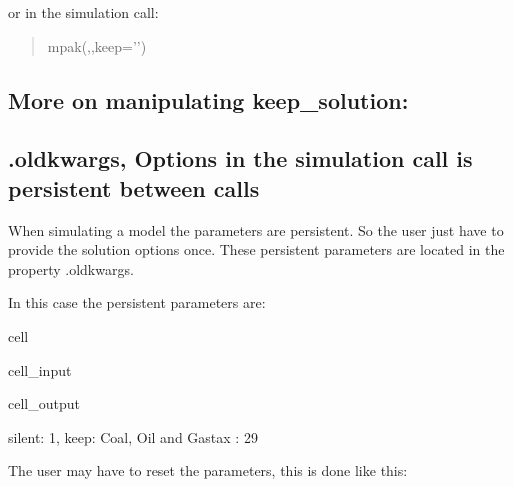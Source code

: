 \documentclass[letterpaper,10pt,english]{jupyterBook}
\begin{document}
\sphinxAtStartPar
or in the simulation call:
\begin{quote}

\sphinxAtStartPar
mpak(,,keep=’’)
\end{quote}


\subsection{More on manipulating keep\_solution:}
\label{\detokenize{content/Python/modelflow_features:more-on-manipulating-keep-solution}}
\sphinxAtStartPar
{\hyperref[\detokenize{content/howto/experiments/create_experiment::doc}]{}}


\subsection{.oldkwargs, Options in the simulation call is persistent between calls}
\label{\detokenize{content/Python/modelflow_features:oldkwargs-options-in-the-simulation-call-is-persistent-between-calls}}
\sphinxAtStartPar
When simulating a model the parameters are persistent. So the user just have to provide the
solution options once. These persistent parameters are located in the property .oldkwargs.

\sphinxAtStartPar
In this case the persistent parameters are:

\begin{sphinxuseclass}{cell}\begin{sphinxVerbatimInput}

\begin{sphinxuseclass}{cell_input}
\begin{sphinxVerbatim}[commandchars=\\\{\}]
\end{sphinxVerbatim}

\end{sphinxuseclass}\end{sphinxVerbatimInput}
\begin{sphinxVerbatimOutput}

\begin{sphinxuseclass}{cell_output}
\begin{sphinxVerbatim}[commandchars=\\\{\}]
\PYGZob{}\PYGZsq{}silent\PYGZsq{}: 1, \PYGZsq{}keep\PYGZsq{}: \PYGZsq{}Coal, Oil and Gastax : 29\PYGZsq{}\PYGZcb{}
\end{sphinxVerbatim}

\end{sphinxuseclass}\end{sphinxVerbatimOutput}

\end{sphinxuseclass}
\sphinxAtStartPar
The user may have to reset the parameters, this is done like this:
\end{document}
